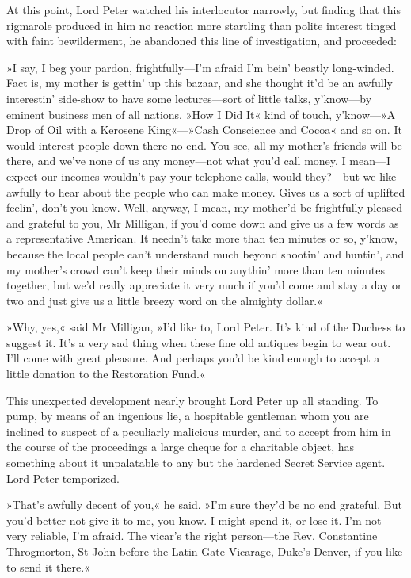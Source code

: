 At this point, Lord Peter watched his interlocutor narrowly, but finding that this rigmarole produced in him no reaction more startling than polite interest tinged with faint bewilderment, he abandoned this line of investigation, and proceeded:

»I say, I beg your pardon, frightfully—I'm afraid I'm bein' beastly long-winded. Fact is, my mother is gettin' up this bazaar, and she thought it'd be an awfully interestin' side-show to have some lectures—sort of little talks, y'know—by eminent business men of all nations. »How I Did It« kind of touch, y'know---»A Drop of Oil with a Kerosene King«---»Cash Conscience and Cocoa« and so on. It would interest people down there no end. You see, all my mother's friends will be there, and we've none of us any money—not what you'd call money, I mean—I expect our incomes wouldn't pay your telephone calls, would they?---but we like awfully to hear about the people who can make money. Gives us a sort of uplifted feelin', don't you know. Well, anyway, I mean, my mother'd be frightfully pleased and grateful to you, Mr Milligan, if you'd come down and give us a few words as a representative American. It needn't take more than ten minutes or so, y'know, because the local people can't understand much beyond shootin' and huntin', and my mother's crowd can't keep their minds on anythin' more than ten minutes together, but we'd really appreciate it very much if you'd come and stay a day or two and just give us a little breezy word on the almighty dollar.«

»Why, yes,« said Mr Milligan, »I'd like to, Lord Peter. It's kind of the Duchess to suggest it. It's a very sad thing when these fine old antiques begin to wear out. I'll come with great pleasure. And perhaps you'd be kind enough to accept a little donation to the Restoration Fund.«

This unexpected development nearly brought Lord Peter up all standing. To pump, by means of an ingenious lie, a hospitable gentleman whom you are inclined to suspect of a peculiarly malicious murder, and to accept from him in the course of the proceedings a large cheque for a charitable object, has something about it unpalatable to any but the hardened Secret Service agent. Lord Peter temporized.

»That's awfully decent of you,« he said. »I'm sure they'd be no end grateful. But you'd better not give it to me, you know. I might spend it, or lose it. I'm not very reliable, I'm afraid. The vicar's the right person—the Rev. Constantine Throgmorton, St John-before-the-Latin-Gate Vicarage, Duke's Denver, if you like to send it there.«

